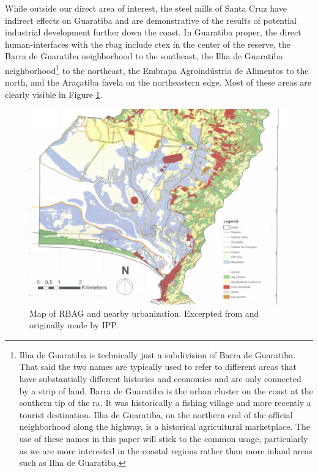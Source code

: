 While outside our direct area of interest, the steel mills of Santa Cruz have indirect effects on Guaratiba and are demonstrative of the results of potential industrial development further down the coast. In Guaratiba proper, the direct human-interfaces with the \ac{rbag} include \ac{ctex} in the center of the reserve, the Barra de Guaratiba neighborhood to the southeast, the Ilha de Guaratiba neighborhood\footnote{Ilha de Guaratiba is technically just a subdivision of Barra de Guaratiba. That said the two names are typically used to refer to different areas that have substantially different histories and economies and are only connected by a strip of land. Barra de Guaratiba is the urban cluster on the coast at the southern tip of the \ac{ra}. It was historically a fishing village and more recently a tourist destination. Ilha de Guaratiba, on the northern end of the official neighborhood along the highway, is a historical agricultural marketplace. The use of these names in this paper will stick to the common usage, particularly as we are more interested in the coastal regions rather than more inland areas such as Ilha de Guaratiba.} to the northeast, the Embrapa Agroindústria de Alimentos to the north, and the Araçatiba favela on the northeastern edge. Most of these areas are clearly visible in Figure \ref{fig:rbag}.

\begin{figure}[h]
	\centering
	\includegraphics[scale=0.3]{Figures/chap4/RBAG.png}
	\caption[Map of RBAG and nearby urbanization]{Map of RBAG and nearby urbanization. Excerpted from \cite{herzogGuaratibaVerdeSubsidios2009} and originally made by IPP.}
	\label{fig:rbag}
\end{figure}

